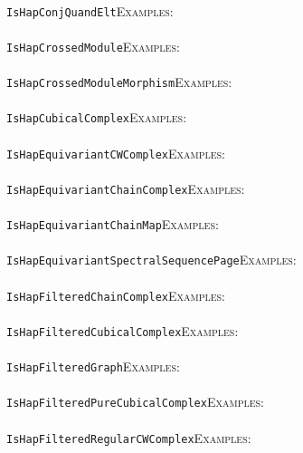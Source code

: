 \documentclass[a4paper,11pt]{report}
\begin{document}
{{ \\
 \texttt{IsHapConjQuandElt}{\nobreakspace}{\nobreakspace}{\nobreakspace}{\nobreakspace}\textsc{Examples:} \\
 \\
 \texttt{IsHapCrossedModule}{\nobreakspace}{\nobreakspace}{\nobreakspace}{\nobreakspace}\textsc{Examples:} \\
 \\
 \texttt{IsHapCrossedModuleMorphism}{\nobreakspace}{\nobreakspace}{\nobreakspace}{\nobreakspace}\textsc{Examples:} \\
 \\
 \texttt{IsHapCubicalComplex}{\nobreakspace}{\nobreakspace}{\nobreakspace}{\nobreakspace}\textsc{Examples:} \\
 \\
 \texttt{IsHapEquivariantCWComplex}{\nobreakspace}{\nobreakspace}{\nobreakspace}{\nobreakspace}\textsc{Examples:} \\
 \\
 \texttt{IsHapEquivariantChainComplex}{\nobreakspace}{\nobreakspace}{\nobreakspace}{\nobreakspace}\textsc{Examples:} \\
 \\
 \texttt{IsHapEquivariantChainMap}{\nobreakspace}{\nobreakspace}{\nobreakspace}{\nobreakspace}\textsc{Examples:} \\
 \\
 \texttt{IsHapEquivariantSpectralSequencePage}{\nobreakspace}{\nobreakspace}{\nobreakspace}{\nobreakspace}\textsc{Examples:} \\
 \\
 \texttt{IsHapFilteredChainComplex}{\nobreakspace}{\nobreakspace}{\nobreakspace}{\nobreakspace}\textsc{Examples:} \\
 \\
 \texttt{IsHapFilteredCubicalComplex}{\nobreakspace}{\nobreakspace}{\nobreakspace}{\nobreakspace}\textsc{Examples:} \\
 \\
 \texttt{IsHapFilteredGraph}{\nobreakspace}{\nobreakspace}{\nobreakspace}{\nobreakspace}\textsc{Examples:} \\
 \\
 \texttt{IsHapFilteredPureCubicalComplex}{\nobreakspace}{\nobreakspace}{\nobreakspace}{\nobreakspace}\textsc{Examples:} \\
 \\
 \texttt{IsHapFilteredRegularCWComplex}{\nobreakspace}{\nobreakspace}{\nobreakspace}{\nobreakspace}\textsc{Examples:} \\
}}
\end{document}
